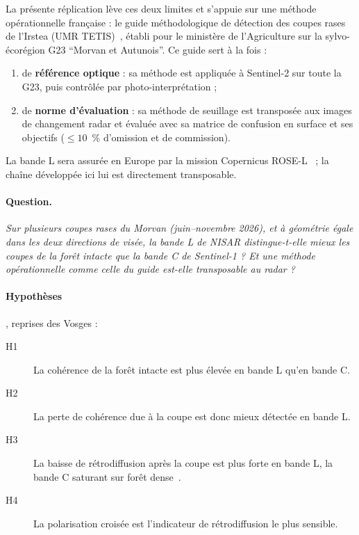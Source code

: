\documentclass[11pt,a4paper]{article}
\begin{document}
La présente réplication lève ces deux limites et s'appuie sur une méthode opérationnelle française : le guide
méthodologique de détection des coupes rases de l'Irstea (UMR TETIS)~\cite{ose2015guide}, établi pour le ministère
de l'Agriculture sur la sylvo-écorégion G23 \enquote{Morvan et Autunois}. Ce guide sert à la fois :
\begin{enumerate}
\item de \textbf{référence optique} : sa méthode est appliquée à Sentinel-2 sur toute la G23, puis contrôlée par
  photo-interprétation ;
\item de \textbf{norme d'évaluation} : sa méthode de seuillage est transposée aux images de changement radar et
  évaluée avec sa matrice de confusion en surface et ses objectifs ($\leq 10$~\% d'omission et de commission).
\end{enumerate}
La bande L sera assurée en Europe par la mission Copernicus ROSE-L~\cite{esa2020rosel} ; la chaîne développée ici
lui est directement transposable.

\paragraph{Question.} \emph{Sur plusieurs coupes rases du Morvan (juin--novembre 2026), et à géométrie égale dans
les deux directions de visée, la bande L de NISAR distingue-t-elle mieux les coupes de la forêt intacte que la
bande C de Sentinel-1 ? Et une méthode opérationnelle comme celle du guide est-elle transposable au radar ?}

\paragraph{Hypothèses}, reprises des Vosges :
\begin{description}
\item[H1] La cohérence de la forêt intacte est plus élevée en bande L qu'en bande C.
\item[H2] La perte de cohérence due à la coupe est donc mieux détectée en bande L.
\item[H3] La baisse de rétrodiffusion après la coupe est plus forte en bande L, la bande C saturant sur forêt
  dense~\cite{imhoff1995saturation,joshi2015mapping}.
\item[H4] La polarisation croisée est l'indicateur de rétrodiffusion le plus sensible.
\end{description}


\end{document}
